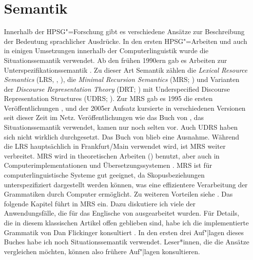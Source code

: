
\chapter{Semantik}
\label{Kapitel-sem}\label{Kapitel-Semantik}


Innerhalb der HPSG"=Forschung gibt es verschiedene Ansätze
zur Beschreibung der Bedeutung sprachlicher Ausdrücke. In den ersten
HPSG"=Arbeiten \citep{ps,ps2,Kiss95a,Mueller99a} und auch in einigen Umsetzungen 
innerhalb der Computerlinguistik \citep{MuellerBabel} wurde die Situationssemantik
\citep*{BP83a,CMP90,Devlin92}\nocite{BP87a} verwendet. Ab den frühen 1990ern gab es Arbeiten zur Unterspezifikationssemantik
\citep{Nerbonne93a}. Zu dieser Art Semantik zählen die \emph{Lexical Resource Semantics} (LRS,
\citealt{RS2004a-u,IR2015a-u,Richter2016a-u,SailerRichter2021a-u}, \citealt[Abschnitt~6.2]{KR2024a}), die \emph{Minimal Recursion Semantics}\indexmrsstart
(MRS; \citealt*{CFPS2005a}) und Varianten der \emph{Discourse Representation Theory} (DRT; \citealt{KR93a}) mit Underspecified
Discourse Representation Structures (UDRS;
\citealt{FR95a-u}). Zur MRS gab es 1995 die ersten Veröffentlichungen \citep*{CFMRS95a-u}, und
der 2005er Aufsatz kursierte in verschiedenen Versionen seit dieser Zeit im Netz. Veröffentlichungen wie das Buch von
\citet{GSag2000a-u}, das Situationssemantik verwendet, kamen nur noch selten vor. Auch UDRS haben
sich nicht wirklich durchgesetzt. Das Buch von \citet{Holler2005a-u} blieb eine Ausnahme.
Während die LRS hauptsächlich in Frankfurt/Main verwendet wird, ist MRS
weiter verbreitet. MRS wird in theoretischen Arbeiten (\zb \citealt{Kiss2001a}) benutzt, aber auch in
Computerimplementationen und Übersetzungssystemen \citep*{FCS2000a,MK2000a,Siegel2000a,BFO2002a-u,MuellerCoreGram}. MRS ist für computerlinguistische Systeme gut geeignet, da
Skopusbeziehungen unterspezifiziert dargestellt werden können, was eine effizientere
Verarbeitung der Grammatiken durch Computer ermöglicht. Zu weiteren Vorteilen siehe .
Das folgende Kapitel führt in MRS ein. Dazu diskutiere ich viele der Anwendungsfälle, die für das
Englische von \citet*{CFPS2005a} ausgearbeitet wurden. Für Details, die in diesem klassischen Artikel
offen geblieben sind, habe ich die implementierte Grammatik von Dan Flickinger konsultiert
\citep*{Flickinger2000a,FCS2000a}. In den ersten drei Auf"|lagen dieses Buches habe ich noch
Situationssemantik verwendet. Leser*innen, die die Ansätze vergleichen möchten, können also frühere
Auf"|lagen konsultieren.%

